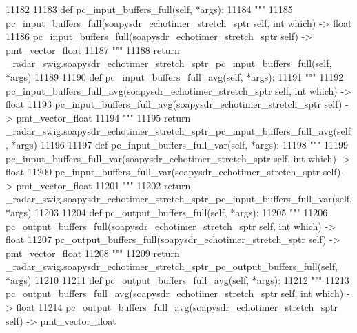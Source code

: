 \begin{DoxyCode}
{{{{{{{{{{{{{{{{{{{{{{{{{{{{{{{{{{{11182 
11183     \textcolor{keyword}{def }pc_input_buffers_full(self, *args):
11184         \textcolor{stringliteral}{"""}
11185 \textcolor{stringliteral}{        pc\_input\_buffers\_full(soapysdr\_echotimer\_stretch\_sptr self, int which) -> float}
11186 \textcolor{stringliteral}{        pc\_input\_buffers\_full(soapysdr\_echotimer\_stretch\_sptr self) -> pmt\_vector\_float}
11187 \textcolor{stringliteral}{        """}
11188         \textcolor{keywordflow}{return} \_radar\_swig.soapysdr\_echotimer\_stretch\_sptr\_pc\_input\_buffers\_full(self, *args)
11189 
11190     \textcolor{keyword}{def }pc_input_buffers_full_avg(self, *args):
11191         \textcolor{stringliteral}{"""}
11192 \textcolor{stringliteral}{        pc\_input\_buffers\_full\_avg(soapysdr\_echotimer\_stretch\_sptr self, int which) -> float}
11193 \textcolor{stringliteral}{        pc\_input\_buffers\_full\_avg(soapysdr\_echotimer\_stretch\_sptr self) -> pmt\_vector\_float}
11194 \textcolor{stringliteral}{        """}
11195         \textcolor{keywordflow}{return} \_radar\_swig.soapysdr\_echotimer\_stretch\_sptr\_pc\_input\_buffers\_full\_avg(self, *args)
11196 
11197     \textcolor{keyword}{def }pc_input_buffers_full_var(self, *args):
11198         \textcolor{stringliteral}{"""}
11199 \textcolor{stringliteral}{        pc\_input\_buffers\_full\_var(soapysdr\_echotimer\_stretch\_sptr self, int which) -> float}
11200 \textcolor{stringliteral}{        pc\_input\_buffers\_full\_var(soapysdr\_echotimer\_stretch\_sptr self) -> pmt\_vector\_float}
11201 \textcolor{stringliteral}{        """}
11202         \textcolor{keywordflow}{return} \_radar\_swig.soapysdr\_echotimer\_stretch\_sptr\_pc\_input\_buffers\_full\_var(self, *args)
11203 
11204     \textcolor{keyword}{def }pc_output_buffers_full(self, *args):
11205         \textcolor{stringliteral}{"""}
11206 \textcolor{stringliteral}{        pc\_output\_buffers\_full(soapysdr\_echotimer\_stretch\_sptr self, int which) -> float}
11207 \textcolor{stringliteral}{        pc\_output\_buffers\_full(soapysdr\_echotimer\_stretch\_sptr self) -> pmt\_vector\_float}
11208 \textcolor{stringliteral}{        """}
11209         \textcolor{keywordflow}{return} \_radar\_swig.soapysdr\_echotimer\_stretch\_sptr\_pc\_output\_buffers\_full(self, *args)
11210 
11211     \textcolor{keyword}{def }pc_output_buffers_full_avg(self, *args):
11212         \textcolor{stringliteral}{"""}
11213 \textcolor{stringliteral}{        pc\_output\_buffers\_full\_avg(soapysdr\_echotimer\_stretch\_sptr self, int which) -> float}
11214 \textcolor{stringliteral}{        pc\_output\_buffers\_full\_avg(soapysdr\_echotimer\_stretch\_sptr self) -> pmt\_vector\_float}
}}}}}}}}}}}}}}}}}}}}}}}}}}}}}}}}}}}
\end{DoxyCode}

